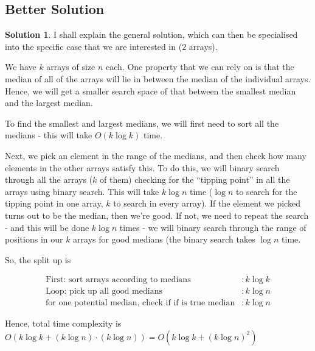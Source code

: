 \documentclass[11pt]{article}
\theoremstyle{definition}
\newtheorem*{solution}{Solution}
\begin{document}
\subsection{Better Solution}
\begin{solution}
I shall explain the general solution, which can then be specialised into the specific case that we are interested in ($2$ arrays).

We have $k$ arrays of size $n$ each. One property that we can rely on is that the median of all of the arrays will lie in between
the median of the individual arrays. Hence, we will get a smaller search space of that between the smallest median and the largest median.

To find the smallest and largest medians, we will first need to sort all the medians - this will take $O(k \log k)$ time.

Next, we pick an element in the range of the medians, and then check how many elements in the other arrays satisfy this. To do this,
we will binary search through all the arrays ($k$ of them) checking for the ``tipping point'' in all the arrays using binary search. This 
will take $k \log n$ time ($\log n$ to search for the tipping point in one array, $k$ to search in every array). If the element we picked turns
out to be the median, then we're good. If not, we need to repeat the search - and this will be done $k \log n$ times - we will binary search through the
range of positions in our $k$ arrays for good medians (the binary search takes $\log n$ time.

So, the split up is

\begin{align*}
\text{First: sort arrays according to medians} &: k \log k \\
\text{Loop: pick up all good medians} &: k \log n \\
\text{for one potential median, check if if is true median} &: k \log n 
\end{align*}

Hence, total time complexity is $O(k \log k + (k \log n) \cdot (k \log n)) = O(k \log k + (k \log n)^{2})$
 
\end{solution}
\end{document}
